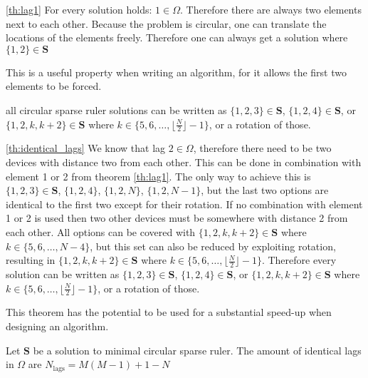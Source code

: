 \documentclass[a4paper, openany, oneside]{memoir}
\begin{document}
\begin{blockProofTheorem}{\ref{th:lag1}}
    For every solution holds: $1 \in \Omega$. Therefore there are always two elements next to each other. Because the problem is circular, one can translate the locations of the elements freely. Therefore one can always get a solution where $\{1,2\} \in \mathbf{S}$
\end{blockProofTheorem}

This is a useful property when writing an algorithm, for it allows the first two elements to be forced.



\begin{blockTheorem} \label{th:lag2}\nolinebreak
    all circular sparse ruler solutions can be written as $\{1,2,3\} \in \mathbf{S}$, $\{1,2,4\} \in \mathbf{S}$,  or $\{1,2,k, k+2\} \in \mathbf{S}$ where $k \in \{5,6,\dots,\lfloor\frac{N}{2}\rfloor-1\}$, or a rotation of those.    \nolinebreak
\end{blockTheorem}

\begin{blockProofTheorem}{\ref{th:identical_lags}}
    We know that lag $2 \in \Omega$, therefore there need to be two devices with distance two from each other. This can be done in combination with element 1 or 2 from theorem \ref{th:lag1}. The only way to achieve this is $\{1,2,3\} \in \mathbf{S}$, $\{1,2,4\}$, $\{1,2,N\}$, $\{1,2,N-1\}$, but the last two options are identical to the first two except for their rotation. If no combination with element 1 or 2 is used then two other devices must be somewhere with distance 2 from each other. All options can be covered with $\{1,2,k, k+2\} \in \mathbf{S}$ where $k \in \{5,6,\dots,N-4\}$, but this set can also be reduced by exploiting rotation, resulting in $\{1,2,k, k+2\} \in \mathbf{S}$ where $k \in \{5,6,\dots,\lfloor\frac{N}{2}\rfloor-1\}$. Therefore every solution can be written as $\{1,2,3\} \in \mathbf{S}$, $\{1,2,4\} \in \mathbf{S}$,  or $\{1,2,k, k+2\} \in \mathbf{S}$ where $k \in \{5,6,\dots,\lfloor\frac{N}{2}\rfloor-1\}$, or a rotation of those. 
\end{blockProofTheorem}

This theorem has the potential to be used for a substantial speed-up when designing an algorithm.

\begin{blockTheorem} \label{th:identical_lags}\nolinebreak
    Let $\mathbf{S}$ be a solution to minimal circular sparse ruler. The amount of identical lags in $\Omega$ are $N_{\text{lags}} = M(M-1)+1-N$   \nolinebreak
\end{blockTheorem}
\end{document}

